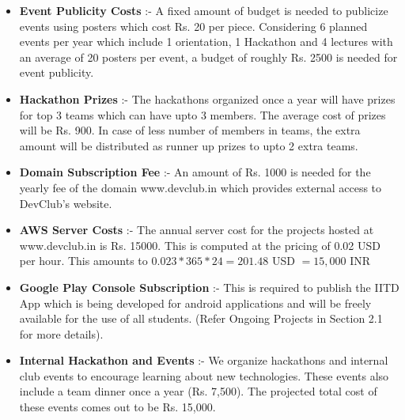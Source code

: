 \documentclass[11pt,a4paper]{article}
\begin{document}
    \begin{itemize}
        \item \textbf{Event Publicity Costs} :- A fixed amount of budget is needed to publicize events using posters which cost Rs. 20 per piece. Considering 6 planned events per year which include 1 orientation, 1 Hackathon and 4 lectures with an average of 20 posters per event, a budget of roughly Rs. 2500 is needed for event publicity.
        \item \textbf{Hackathon Prizes} :- The hackathons organized once a year will have prizes for top 3 teams which can have upto 3 members. The average cost of prizes will be Rs. 900. In case of less number of members in teams, the extra amount will be distributed as runner up prizes to upto 2 extra teams.
        \item \textbf{Domain Subscription Fee} :- An amount of Rs. 1000 is needed for the yearly fee of the domain www.devclub.in which provides external access to DevClub's website.
        \item \textbf{AWS Server Costs} :- The annual server cost for the projects hosted at www.devclub.in is Rs. 15000. This is computed at the pricing of 0.02 USD per hour. This amounts to $0.023*365*24 = 201.48$ USD $= 15,000$ INR
        \item \textbf{Google Play Console Subscription} :- This is required to publish the IITD App which is being developed for android applications and will be freely available for the use of all students. (Refer Ongoing Projects in Section 2.1 for more details).
        \item \textbf{Internal Hackathon and Events} :- We organize hackathons and internal club events to encourage learning about new technologies. These events also include a team dinner once a year (Rs. 7,500). The projected total cost of these events comes out to be Rs. 15,000.
        
    \end{itemize}
    
\end{document}
